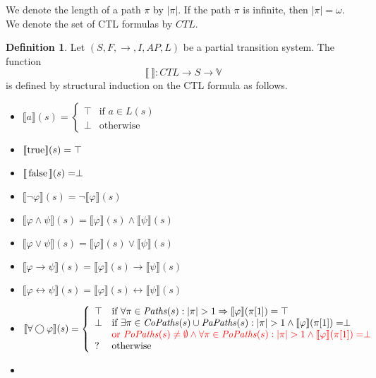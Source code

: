 \documentclass[12pt]{article}
\newcommand{\nxt}{\bigcirc}
\newcommand{\TRUE}{\mbox{\lstinline{true}}}
\newcommand{\FALSE}{\mbox{\lstinline{false}}}
\theoremstyle{definition}
\newtheorem{definition}{Definition}
\newcommand{\satisfaction}[1]{\llbracket #1 \rrbracket}
\newenvironment{franck}{\color{red}}{\color{black}}
\begin{document}
We denote the length of a path $\pi$ by $|\pi|$.  If the path $\pi$ is infinite, then $|\pi| = \omega$.  We denote the set of CTL formulas by $\mathit{CTL}$.

\begin{definition}
Let $(S, F, \rightarrow, I, \mathit{AP}, L)$ be a partial transition system.  The function 
\[
\satisfaction{\ } : \mathit{CTL} \to S \to \mathbb{V}
\] 
is defined by structural induction on the CTL formula as follows.
\begin{itemize}
\item 
$\satisfaction{a}(s) = \left \{
\begin{array}{ll}
\top & \mbox{if $a \in L(s)$}\\
\perp & \mbox{otherwise}
\end{array}\right .
$
\item 
$\satisfaction{\TRUE}(s) = \top$ 
\item 
$\satisfaction{\FALSE}(s) = \perp$ 
\item 
$\satisfaction{\neg \varphi}(s) = \neg \satisfaction{\varphi}(s)$ 
\item 
$\satisfaction{\varphi \wedge \psi}(s) = \satisfaction{\varphi}(s) \wedge \satisfaction{\psi}(s)$ 
\item 
$\satisfaction{\varphi \vee \psi}(s) = \satisfaction{\varphi}(s) \vee \satisfaction{\psi}(s)$ 
\item 
$\satisfaction{\varphi \rightarrow \psi}(s) = \satisfaction{\varphi}(s) \rightarrow \satisfaction{\psi}(s)$ 
\item 
$\satisfaction{\varphi \leftrightarrow \psi}(s) = \satisfaction{\varphi}(s) \leftrightarrow \satisfaction{\psi}(s)$ 
\item
$\satisfaction{\forall \nxt \varphi}(s) = \left \{
\begin{array}{ll}
\top & \mbox{if $\forall \pi \in \mathit{Paths}(s) : |\pi| > 1 \Rightarrow \satisfaction{\varphi}(\pi[1]) = \top$}\\
\perp & \mbox{if $\exists \pi \in \mathit{CoPaths}(s) \cup \mathit{PaPaths}(s) : |\pi| > 1 \wedge \satisfaction{\varphi}(\pi[1]) = \perp$}\\
& \mbox{\begin{franck}or $\mathit{PoPaths}(s) \not= \emptyset \wedge \forall \pi \in \mathit{PoPaths}(s) : |\pi| > 1 \wedge \satisfaction{\varphi}(\pi[1]) = \perp$\end{franck}}\\
? & \mbox{otherwise}
\end{array}
\right .
$
\item

\end{itemize}
\end{definition}
\end{document}
